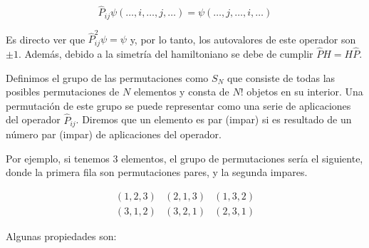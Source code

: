 \documentclass{article} %
\begin{document}
\begin{equation}
\hat{P}_{ij} \psi (\ldots, i, \ldots, j, \ldots) = \psi (\ldots, j, \ldots, i, \ldots)
\end{equation}

Es directo ver que $\hat{P}^2_{ij} \psi = \psi$ y, por lo tanto, los autovalores de este operador son $\pm 1$. Además, debido a la simetría del hamiltoniano se debe de cumplir $\hat{P} H = H \hat{P}$.

Definimos el grupo de las permutaciones como $S_N$ que consiste de todas las posibles permutaciones de $N$ elementos y consta de $N!$ objetos en su interior. Una permutación de este grupo se puede representar como una serie de aplicaciones del operador $\hat{P}_{ij}$. Diremos que un elemento es par (impar) si es resultado de un número par (impar) de aplicaciones del operador.

Por ejemplo, si tenemos 3 elementos, el grupo de permutaciones sería el siguiente, donde la primera fila son permutaciones pares, y la segunda impares.

$$
\begin{array}{ccc}
(1, 2, 3) & (2, 1, 3) & (1, 3, 2) \\
(3, 1, 2) & (3, 2, 1) & (2, 3, 1)
\end{array}
$$

Algunas propiedades son:
\end{document}
